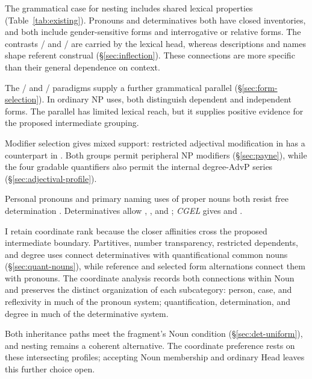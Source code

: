 \documentclass[12pt]{article}
\begin{document}
The grammatical case for nesting includes shared lexical properties (Table~\ref{tab:existing}). Pronouns and determinatives both have closed inventories, and both include gender-sensitive forms and interrogative or relative forms. The contrasts / and / are carried by the lexical head, whereas descriptions and names shape referent construal (§\ref{sec:inflection}). These connections are more specific than their general dependence on context.

The / and / paradigms supply a further grammatical parallel (§\ref{sec:form-selection}). In ordinary NP uses, both distinguish dependent and independent forms. The parallel has limited lexical reach, but it supplies positive evidence for the proposed intermediate grouping.

Modifier selection gives mixed support: restricted adjectival modification in  \citep[429--430]{huddleston2002} has a counterpart in . Both groups permit peripheral NP modifiers (§\ref{sec:payne}), while the four gradable quantifiers also permit the internal degree-AdvP series (§\ref{sec:adjectival-profile}).

Personal pronouns and primary naming uses of proper nouns both resist free determination \citep[429--430, 517, 519--520]{huddleston2002}. Determinatives allow , , and ; \textit{CGEL} gives  and  \citep[415--416]{huddleston2002}.

I retain coordinate rank because the closer affinities cross the proposed intermediate boundary. Partitives, number transparency, restricted dependents, and degree uses connect determinatives with quantificational common nouns (§\ref{sec:quant-nouns}), while reference and selected form alternations connect them with pronouns. The coordinate analysis records both connections within Noun and preserves the distinct organization of each subcategory: person, case, and reflexivity in much of the pronoun system; quantification, determination, and degree in much of the determinative system.

Both inheritance paths meet the fragment's Noun condition (§\ref{sec:det-uniform}), and nesting remains a coherent alternative. The coordinate preference rests on these intersecting profiles; accepting Noun membership and ordinary Head leaves this further choice open.
\end{document}
